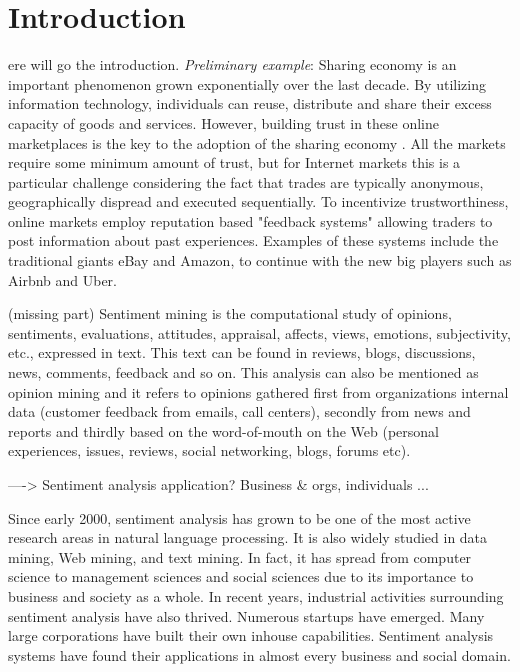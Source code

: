 %
%
\let\textcircled=\pgftextcircled
\chapter{Introduction}
\label{chap:intro}

ere will go the introduction. \textit{Preliminary example}: Sharing economy is an important phenomenon grown exponentially over the last decade. By utilizing information technology, individuals can reuse, distribute and share their excess capacity of goods and services. However, building trust in these online marketplaces is the key to the adoption of the sharing economy \cite{owen2014trust}. All the markets require some minimum amount of trust, but for Internet markets this is a particular challenge considering the fact that trades are typically anonymous, geographically dispread and executed sequentially. To incentivize trustworthiness, online markets employ reputation based "feedback systems" allowing traders to post information about past experiences. Examples of these systems include the traditional giants eBay and Amazon, to continue with the new big players such as Airbnb and Uber.

(missing part)
Sentiment mining is the computational study of opinions, sentiments, evaluations, attitudes, appraisal, affects, views, emotions, subjectivity, etc., expressed in text. This text can be found in reviews, blogs, discussions, news, comments, feedback and so on. This analysis can also be mentioned as opinion mining and it refers to opinions gathered first from organizations internal data (customer feedback from emails, call centers), secondly from news and reports and thirdly based on the word-of-mouth on the Web (personal experiences, issues, reviews, social networking, blogs, forums etc). 

----> Sentiment analysis application? Business \& orgs, individuals ...

Since early 2000, sentiment analysis has grown to be one of the most
active research areas in natural language processing. It is also widely studied
in data mining, Web mining, and text mining. In fact, it has spread from
computer science to management sciences and social sciences due to its
importance to business and society as a whole. In recent years, industrial
activities surrounding sentiment analysis have also thrived. Numerous
startups have emerged. Many large corporations have built their own inhouse
capabilities. Sentiment analysis systems have found their applications
in almost every business and social domain.

